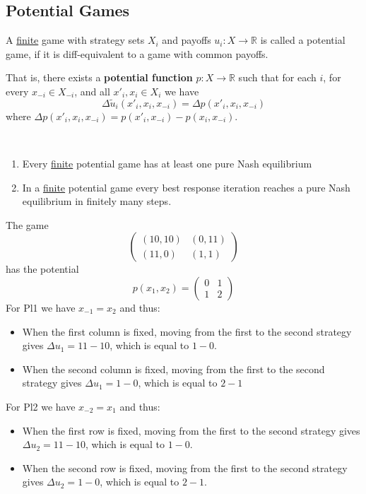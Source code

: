 \documentclass[../main.tex]{subfiles}
\begin{document}
\subsection{Potential Games}
\vspace{0.25cm}
\begin{definition}
    A \underline{finite} game with strategy sets $X_i$ and payoffs $u_i : X \to \mathbb{R}$ is called a potential game, if it is diff-equivalent to a game with common payoffs.

    That is, there exists a \textbf{potential function} $p : X \to \mathbb{R}$ such that for each $i$, for every $x_{-i} \in X_{-i}$, and all $x'_i ,x_i \in X_i$ we have
    \[
        \Delta \tilde{u}_i(x'_i, x_i, x_{-i}) = \Delta p(x'_i, x_i, x_{-i})
    \]
    where $\Delta p(x'_i, x_i, x_{-i}) = p(x'_i, x_{-i}) - p(x_i, x_{-i})$.
\end{definition}
\begin{corollary}\
    \begin{enumerate}
        \item Every \underline{finite} potential game has at least one pure Nash equilibrium
        \item In a \underline{finite} potential game every best response iteration reaches a pure Nash equilibrium in finitely many steps.
    \end{enumerate}
\end{corollary}
\begin{example}
    The game
    \[
        \begin{pmatrix}
            (10,10) & (0,11) \\
            (11,0)  & (1,1)
        \end{pmatrix}
    \]
    has the potential
    \[
        p(x_1, x_2) = \begin{pmatrix}
            0 & 1 \\
            1 & 2
        \end{pmatrix}
    \]
    For Pl1 we have $x_{-1} = x_2$ and thus:
    \begin{itemize}
        \item When the first column is fixed, moving from the first to the second strategy gives $\Delta u_1 = 11-10$, which is equal to $1-0$.
        \item When the second column is fixed, moving from the first to the second strategy gives $\Delta u_1 = 1-0$, which is equal to $2-1$
    \end{itemize}
    For Pl2 we have $x_{-2} = x_1$ and thus:
    \begin{itemize}
        \item When the first row is fixed, moving from the first to the second strategy gives $\Delta u_2 = 11-10$, which is equal to $1-0$.
        \item When the second row is fixed, moving from the first to the second strategy gives $\Delta u_2 = 1-0$, which is equal to $2-1$.
    \end{itemize}
\end{example}
\end{document}
